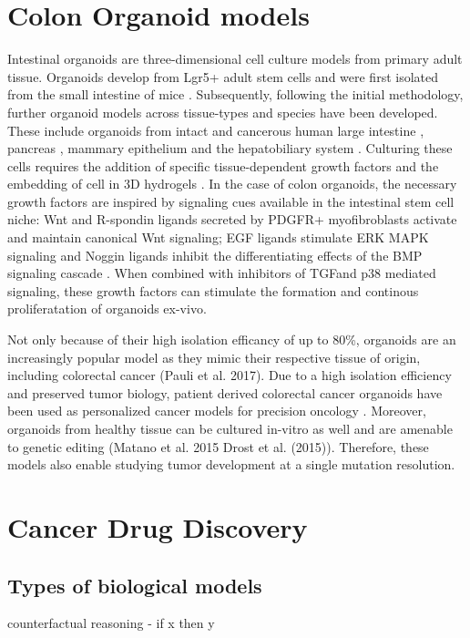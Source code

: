 \begin{flushleft}
\section{Colon Organoid models}
Intestinal organoids are three-dimensional cell culture models from primary adult tissue. Organoids develop from Lgr5+ adult stem cells and were first isolated from the small intestine of mice \cite{Sato2011}. Subsequently, following the initial methodology, further organoid models across tissue-types and species have been developed. These include organoids from intact and cancerous human large intestine \cite{Sato2011}, pancreas \cite{Sachs2017}, mammary epithelium \cite{Zhang2016EstablishingCells, Sachs2017AHeterogeneity}and the hepatobiliary system \cite{Huch2013NIHAccess, Broutier2016CultureManipulation.}.
Culturing these cells requires the addition of specific tissue-dependent growth factors and the embedding of cell in 3D hydrogels \cite{Merker2016GastrointestinalOut}. In the case of colon organoids, the necessary growth factors are inspired by signaling cues available in the intestinal stem cell niche: Wnt and R-spondin ligands secreted by PDGFR+ myofibroblasts activate and maintain canonical Wnt signaling; EGF ligands stimulate ERK MAPK signaling and Noggin ligands inhibit the differentiating effects of the BMP signaling cascade \cite{Sato2013}. When combined with inhibitors of TGF\textbeta and p38 mediated signaling, these growth factors can stimulate the formation and continous proliferatation of organoids ex-vivo. 

Not only because of their high isolation efficancy of up to 80\%, organoids are an increasingly popular model as they mimic their respective tissue of origin, including colorectal cancer (Pauli et al. 2017). Due to a high isolation efficiency and preserved tumor biology, patient derived colorectal cancer organoids have been used as personalized cancer models for precision oncology \cite{VanDeWetering2015, Vlachogiannis2018}. Moreover, organoids from healthy tissue can be cultured in-vitro as well and are amenable to genetic editing (Matano et al. 2015 Drost et al. (2015)). Therefore, these models also enable studying tumor development at a single mutation resolution.


\section{Cancer Drug Discovery}
\subsection{Types of biological models}
counterfactual reasoning - if x then y



\end{flushleft}
